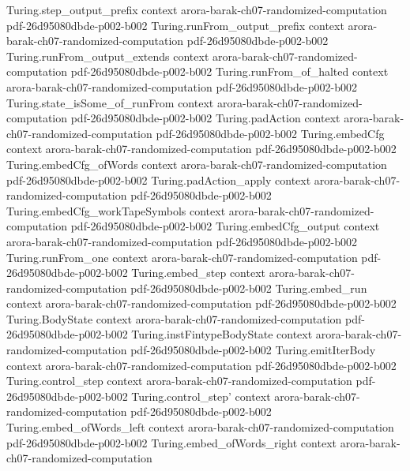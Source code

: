 \begin{theorem}
\proofstep
  {Turing.step_output_prefix}
  {context}
  {arora-barak-ch07-randomized-computation}
  {pdf-26d95080dbde-p002-b002}
\proofstep
  {Turing.runFrom_output_prefix}
  {context}
  {arora-barak-ch07-randomized-computation}
  {pdf-26d95080dbde-p002-b002}
\proofstep
  {Turing.runFrom_output_extends}
  {context}
  {arora-barak-ch07-randomized-computation}
  {pdf-26d95080dbde-p002-b002}
\proofstep
  {Turing.runFrom_of_halted}
  {context}
  {arora-barak-ch07-randomized-computation}
  {pdf-26d95080dbde-p002-b002}
\proofstep
  {Turing.state_isSome_of_runFrom}
  {context}
  {arora-barak-ch07-randomized-computation}
  {pdf-26d95080dbde-p002-b002}
\proofstep
  {Turing.padAction}
  {context}
  {arora-barak-ch07-randomized-computation}
  {pdf-26d95080dbde-p002-b002}
\proofstep
  {Turing.embedCfg}
  {context}
  {arora-barak-ch07-randomized-computation}
  {pdf-26d95080dbde-p002-b002}
\proofstep
  {Turing.embedCfg_ofWords}
  {context}
  {arora-barak-ch07-randomized-computation}
  {pdf-26d95080dbde-p002-b002}
\proofstep
  {Turing.padAction_apply}
  {context}
  {arora-barak-ch07-randomized-computation}
  {pdf-26d95080dbde-p002-b002}
\proofstep
  {Turing.embedCfg_workTapeSymbols}
  {context}
  {arora-barak-ch07-randomized-computation}
  {pdf-26d95080dbde-p002-b002}
\proofstep
  {Turing.embedCfg_output}
  {context}
  {arora-barak-ch07-randomized-computation}
  {pdf-26d95080dbde-p002-b002}
\proofstep
  {Turing.runFrom_one}
  {context}
  {arora-barak-ch07-randomized-computation}
  {pdf-26d95080dbde-p002-b002}
\proofstep
  {Turing.embed_step}
  {context}
  {arora-barak-ch07-randomized-computation}
  {pdf-26d95080dbde-p002-b002}
\proofstep
  {Turing.embed_run}
  {context}
  {arora-barak-ch07-randomized-computation}
  {pdf-26d95080dbde-p002-b002}
\proofstep
  {Turing.BodyState}
  {context}
  {arora-barak-ch07-randomized-computation}
  {pdf-26d95080dbde-p002-b002}
\proofstep
  {Turing.instFintypeBodyState}
  {context}
  {arora-barak-ch07-randomized-computation}
  {pdf-26d95080dbde-p002-b002}
\proofstep
  {Turing.emitIterBody}
  {context}
  {arora-barak-ch07-randomized-computation}
  {pdf-26d95080dbde-p002-b002}
\proofstep
  {Turing.control_step}
  {context}
  {arora-barak-ch07-randomized-computation}
  {pdf-26d95080dbde-p002-b002}
\proofstep
  {Turing.control_step'}
  {context}
  {arora-barak-ch07-randomized-computation}
  {pdf-26d95080dbde-p002-b002}
\proofstep
  {Turing.embed_ofWords_left}
  {context}
  {arora-barak-ch07-randomized-computation}
  {pdf-26d95080dbde-p002-b002}
\proofstep
  {Turing.embed_ofWords_right}
  {context}
  {arora-barak-ch07-randomized-computation}

\end{theorem}
